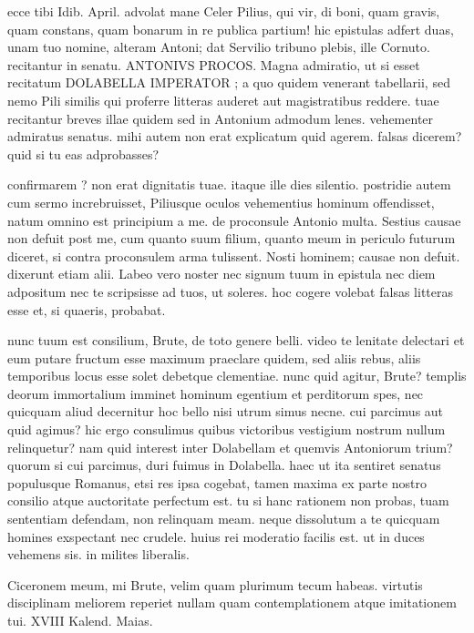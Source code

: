  ecce tibi Idib. April. advolat mane Celer Pilius, qui vir, di boni, quam gravis, quam constans, quam bonarum in re publica partium! hic epistulas adfert duas, unam tuo nomine, alteram Antoni; dat Servilio tribuno plebis, ille Cornuto. recitantur in senatu. ANTONIVS PROCOS. Magna admiratio, ut si esset recitatum DOLABELLA IMPERATOR ; a quo quidem venerant tabellarii, sed nemo Pili similis qui proferre litteras auderet aut magistratibus reddere. tuae recitantur breves illae quidem sed in Antonium admodum lenes. vehementer admiratus senatus. mihi autem non erat explicatum quid agerem. falsas dicerem? quid si tu eas adprobasses?

 confirmarem ? non erat dignitatis tuae. itaque ille dies silentio. postridie autem cum sermo increbruisset, Piliusque oculos vehementius hominum offendisset, natum omnino est principium a me. de proconsule Antonio multa. Sestius causae non defuit post me, cum quanto suum filium, quanto meum in periculo futurum diceret, si contra proconsulem arma tulissent. Nosti hominem; causae non defuit. dixerunt etiam alii. Labeo vero noster nec signum tuum in epistula nec diem adpositum nec te scripsisse ad tuos, ut soleres. hoc cogere volebat falsas litteras esse et, si quaeris, probabat.

 nunc tuum est consilium, Brute, de toto genere belli. video te lenitate delectari et eum putare fructum esse maximum praeclare quidem, sed aliis rebus, aliis temporibus locus esse solet debetque clementiae. nunc quid agitur, Brute? templis deorum immortalium imminet hominum egentium et perditorum spes, nec quicquam aliud decernitur hoc bello nisi utrum simus necne. cui parcimus aut quid agimus? hic ergo consulimus quibus victoribus vestigium nostrum nullum relinquetur? nam quid interest inter Dolabellam et quemvis Antoniorum trium? quorum si cui parcimus, duri fuimus in Dolabella. haec ut ita sentiret senatus populusque Romanus, etsi res ipsa cogebat, tamen maxima ex parte nostro consilio atque auctoritate perfectum est. tu si hanc rationem non probas, tuam sententiam defendam, non relinquam meam. neque dissolutum a te quicquam homines exspectant nec crudele. huius rei moderatio facilis est. ut in duces vehemens sis. in milites liberalis.

 Ciceronem meum, mi Brute, velim quam plurimum tecum habeas. virtutis disciplinam meliorem reperiet nullam quam contemplationem atque imitationem tui. XVIII Kalend. Maias.
